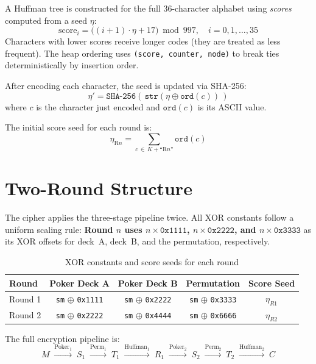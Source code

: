 \documentclass[12pt,a4paper]{article}
\begin{document}
A Huffman tree is constructed for the full 36-character alphabet using \emph{scores} computed from a seed $\eta$:
\[
    \text{score}_i = \bigl((i+1) \cdot \eta + 17\bigr) \bmod 997, \quad i = 0, 1, \ldots, 35
\]
Characters with lower scores receive longer codes (they are treated as less frequent). The heap ordering uses \texttt{(score, counter, node)} to break ties deterministically by insertion order.

After encoding each character, the seed is updated via SHA-256:
\[
    \eta' = \texttt{SHA-256}\!\left(\,\texttt{str}(\eta \oplus \texttt{ord}(c))\,\right)
\]
where $c$ is the character just encoded and $\texttt{ord}(c)$ is its ASCII value.

The initial score seed for each round is:
\[
    \eta_{\text{R}n} = \sum_{c \,\in\, K + \text{``R}n\text{''}} \texttt{ord}(c)
\]

\section{Two-Round Structure}
\label{sec:rounds}

The cipher applies the three-stage pipeline twice. All XOR constants follow a uniform scaling rule: \textbf{Round $n$ uses $n \times \texttt{0x1111}$, $n \times \texttt{0x2222}$, and $n \times \texttt{0x3333}$} as its XOR offsets for deck~A, deck~B, and the permutation, respectively.

\begin{table}[H]
\centering
\caption{XOR constants and score seeds for each round}
\begin{tabular}{lcccc}
\toprule
\textbf{Round} & \textbf{Poker Deck A} & \textbf{Poker Deck B} & \textbf{Permutation} & \textbf{Score Seed} \\
\midrule
Round 1 & \texttt{sm} $\oplus$ \texttt{0x1111} & \texttt{sm} $\oplus$ \texttt{0x2222} & \texttt{sm} $\oplus$ \texttt{0x3333} & $\eta_{R1}$ \\
Round 2 & \texttt{sm} $\oplus$ \texttt{0x2222} & \texttt{sm} $\oplus$ \texttt{0x4444} & \texttt{sm} $\oplus$ \texttt{0x6666} & $\eta_{R2}$ \\
\bottomrule
\end{tabular}
\end{table}

\noindent The full encryption pipeline is:
\[
M \;\xrightarrow{\text{Poker}_1}\; S_1
  \;\xrightarrow{\text{Perm}_1}\; T_1
  \;\xrightarrow{\text{Huffman}_1}\; R_1
  \;\xrightarrow{\text{Poker}_2}\; S_2
  \;\xrightarrow{\text{Perm}_2}\; T_2
  \;\xrightarrow{\text{Huffman}_2}\; C
\]
\end{document}
